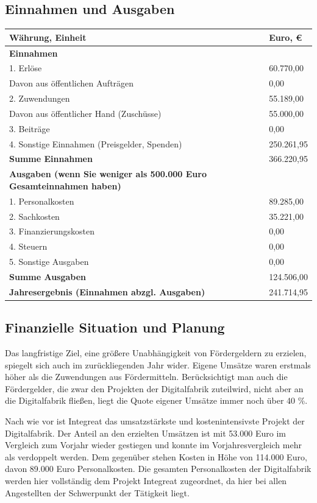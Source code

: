 \documentclass[12pt, a4paper]{article} %
\begin{document}
\hypertarget{einnahmen-und-ausgaben}{%
\subsection{Einnahmen und Ausgaben}\label{einnahmen-und-ausgaben}}

\begin{longtable}[]{@{}ll@{}}
\toprule
\textbf{Währung, Einheit} & \textbf{Euro, \euro}\tabularnewline
\midrule
\endhead
\textbf{Einnahmen} &\tabularnewline
1. Erlöse & 60.770,00\tabularnewline
Davon aus öffentlichen Aufträgen & 0,00\tabularnewline
2. Zuwendungen & 55.189,00\tabularnewline
Davon aus öffentlicher Hand (Zuschüsse) & 55.000,00\tabularnewline
3. Beiträge & 0,00\tabularnewline
4. Sonstige Einnahmen (Preisgelder, Spenden) & 250.261,95\tabularnewline
\textbf{Summe Einnahmen} & 366.220,95\tabularnewline
\textbf{Ausgaben (wenn Sie weniger als 500.000 Euro Gesamteinnahmen
haben)} &\tabularnewline
1. Personalkosten & 89.285,00\tabularnewline
2. Sachkosten & 35.221,00\tabularnewline
3. Finanzierungskosten & 0,00\tabularnewline
4. Steuern & 0,00\tabularnewline
5. Sonstige Ausgaben & 0,00\tabularnewline
\textbf{Summe Ausgaben} & 124.506,00\tabularnewline
\textbf{Jahresergebnis (Einnahmen abzgl. Ausgaben)} &
241.714,95\tabularnewline
\bottomrule
\end{longtable}

\hypertarget{finanzielle-situation-und-planung}{%
\subsection{Finanzielle Situation und
Planung}\label{finanzielle-situation-und-planung}}

Das langfristige Ziel, eine größere Unabhängigkeit von Fördergeldern zu
erzielen, spiegelt sich auch im zurückliegenden Jahr wider. Eigene
Umsätze waren erstmals höher als die Zuwendungen aus Fördermitteln.
Berücksichtigt man auch die Fördergelder, die zwar den Projekten der
Digitalfabrik zuteilwird, nicht aber an die Digitalfabrik fließen, liegt
die Quote eigener Umsätze immer noch über 40 \%.

Nach wie vor ist Integreat das umsatzstärkste und kostenintensivste
Projekt der Digitalfabrik. Der Anteil an den erzielten Umsätzen ist mit
53.000 Euro im Vergleich zum Vorjahr wieder gestiegen und konnte im
Vorjahresvergleich mehr als verdoppelt werden. Dem gegenüber stehen
Kosten in Höhe von 114.000 Euro, davon 89.000 Euro Personalkosten. Die
gesamten Personalkosten der Digitalfabrik werden hier vollständig dem
Projekt Integreat zugeordnet, da hier bei allen Angestellten der
Schwerpunkt der Tätigkeit liegt.
\end{document}
